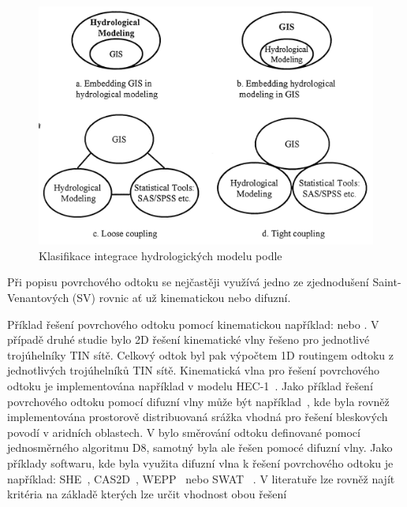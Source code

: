 \begin{figure}
  \centering
  \includegraphics[width=\linewidth]{./img/klasifikaceGISHyd.png}
  \caption{Klasifikace integrace hydrologických modelu podle~\cite{sui1999}}
  \label{fig:klasGISHyd}
\end{figure}

Při popisu povrchového odtoku se nejčastěji využívá jedno ze zjednodušení Saint-Venantových (SV) rovnic ať už kinematickou nebo difuzní. 

Příklad řešení povrchového odtoku pomocí kinematickou například: \cite{taylor1974} nebo \cite{goodrich1991}. V případě druhé studie bylo 2D řešení kinematické vlny řešeno pro jednotlivé trojúhelníky TIN sítě. Celkový odtok byl pak výpočtem 1D routingem odtoku z jednotlivých trojúhelníků TIN sítě. Kinematická vlna pro řešení povrchového odtoku je implementována například v modelu HEC-1~\citep{macarthur1993}. Jako příklad řešení povrchového odtoku pomocí difuzní vlny může být například~\cite{julien1995}, kde byla rovněž implementována prostorově distribuovaná srážka vhodná pro řešení bleskových povodí v aridních oblastech. V \cite{jain2004} bylo směrování odtoku definované pomocí jednosměrného algoritmu D8, samotný byla ale řešen pomocé difuzní vlny. Jako příklady softwaru, kde byla využita difuzní vlna k řešení povrchového odtoku je například: SHE~\cite{abbott1986_1, abbott1986_2}, CAS2D~\cite{julien1995}, WEPP~\citep{flanagan2010} nebo SWAT ~\citep{USDA}. V literatuře lze rovněž najít kritéria na základě kterých lze určit vhodnost obou řešení~\cite{singh1994, moramarco2002}

